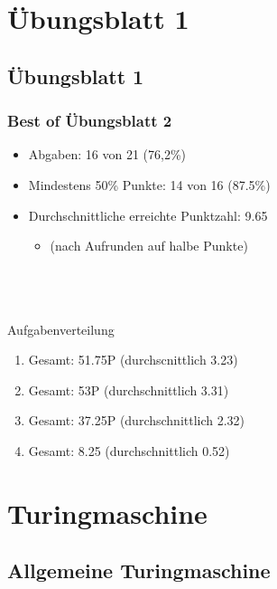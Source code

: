 


\section{Übungsblatt 1}
\subsection{Übungsblatt 1}

\begin{frame}
\frametitle{Best of Übungsblatt 2}
\begin{itemize}
	\item Abgaben: 16 von 21 (76,2\%)
	\item Mindestens 50\% Punkte: 14 von 16 (87.5\%)
	\item Durchschnittliche erreichte Punktzahl: 9.65
	\begin{itemize}
		\item (nach Aufrunden auf halbe Punkte)
	\end{itemize}
\end{itemize}~\\~\\~\\
Aufgabenverteilung
\begin{enumerate}[{A}ufg{a}be 1:]
	\item Gesamt: 51.75P (durchscnittlich 3.23)
	\item Gesamt: 53P (durchschnittlich 3.31)
	\item Gesamt: 37.25P (durchschnittlich 2.32)
	\item Gesamt: 8.25 (durchschnittlich 0.52)
\end{enumerate}
\end{frame}

\section{Turingmaschine}
\subsection{Allgemeine Turingmaschine}

